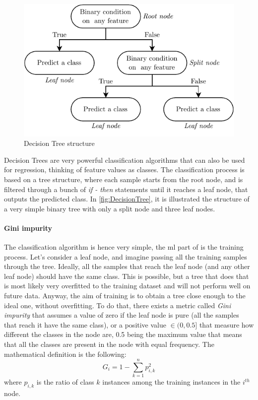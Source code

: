\begin{figure}
    \centering
    \includegraphics[scale = 1]{images/MachineLearning/DT_structure.pdf}
    \caption{Decision Tree structure}
    \label{fig:DecisionTree}
\end{figure}

Decision Trees are very powerful classification algorithms that can also be used for regression, thinking of feature values as classes. The classification process is based on a tree structure, where each sample starts from the root node, and is filtered through a bunch of \emph{if - then} statements until it reaches a leaf node, that outputs the predicted class. In \autoref{fig:DecisionTree}, it is illustrated the structure of a very simple binary tree with only a split node and three leaf nodes.

\paragraph*{Gini impurity}
The classification algorithm is hence very simple, the \gls{ml} part of is the training process. Let's consider a leaf node, and imagine passing all the training samples through the tree. Ideally, all the samples that reach the leaf node (and any other leaf node) should have the same class. This is possible, but a tree that does that is most likely very overfitted to the training dataset and will not perform well on future data. Anyway, the aim of training is to obtain a tree close enough to the ideal one, without overfitting. To do that, there exists a metric called \emph{Gini impurity} that assumes a value of zero if the leaf node is pure (all the samples that reach it have the same class), or a positive value $\in (0,0.5]$ that measure how different the classes in the node are, 0.5 being the maximum value that means that all the classes are present in the node with equal frequency. The mathematical definition is the following:
\begin{equation}
    G_i = 1 - \sum_{k=1}^{n}p_{i,k}^2
\end{equation}
where $p_{i,k}$ is the ratio of class $k$ instances among the training instances in the $i^{th}$ node.

